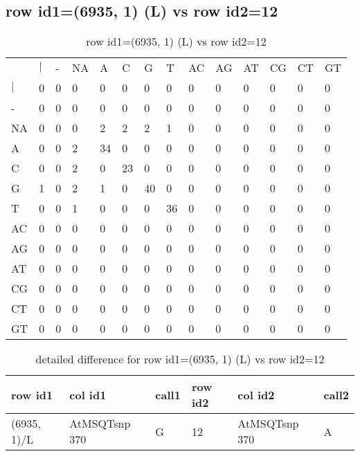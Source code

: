 \subsection{row id1=(6935, 1) (L) vs row id2=12}
\begin{center}
\begin{longtable}{|l|l|l|l|l|l|l|l|l|l|l|l|l|l|}
\caption{row id1=(6935, 1) (L) vs row id2=12} \label{table_dm138}\\
\hline
\\
\hline
&$|$&-&NA&A&C&G&T&AC&AG&AT&CG&CT&GT\\
$|$&0&0&0&0&0&0&0&0&0&0&0&0&0\\
-&0&0&0&0&0&0&0&0&0&0&0&0&0\\
NA&0&0&0&2&2&2&1&0&0&0&0&0&0\\
A&0&0&2&34&0&0&0&0&0&0&0&0&0\\
C&0&0&2&0&23&0&0&0&0&0&0&0&0\\
G&1&0&2&1&0&40&0&0&0&0&0&0&0\\
T&0&0&1&0&0&0&36&0&0&0&0&0&0\\
AC&0&0&0&0&0&0&0&0&0&0&0&0&0\\
AG&0&0&0&0&0&0&0&0&0&0&0&0&0\\
AT&0&0&0&0&0&0&0&0&0&0&0&0&0\\
CG&0&0&0&0&0&0&0&0&0&0&0&0&0\\
CT&0&0&0&0&0&0&0&0&0&0&0&0&0\\
GT&0&0&0&0&0&0&0&0&0&0&0&0&0\\
\hline
\end{longtable}
\end{center}

\begin{center}
\begin{longtable}{|l|l|l|l|l|l|}
\caption{detailed difference for row id1=(6935, 1) (L) vs row id2=12} \label{table_dm139}\\
\hline
row id1&col id1&call1&row id2&col id2&call2\\
\hline
(6935, 1)/L&AtMSQTsnp 370&G&12&AtMSQTsnp 370&A\\
\hline
\end{longtable}
\end{center}

